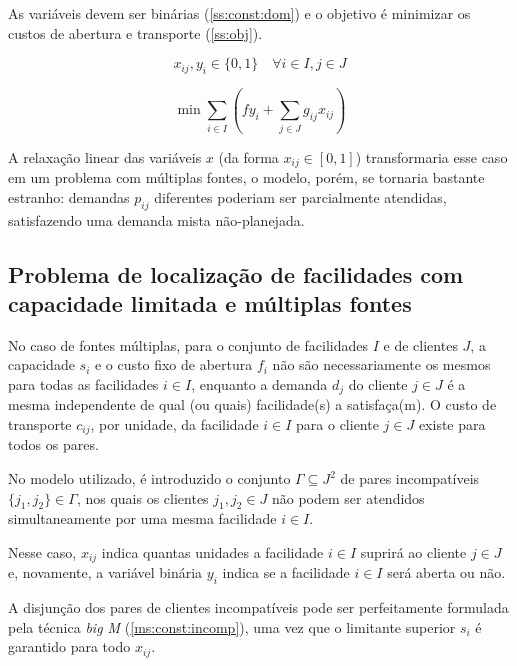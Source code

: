 \documentclass[]{article}
\begin{document}
	As variáveis devem ser binárias (\ref{ss:const:dom}) 
	e o objetivo é minimizar os custos de abertura e transporte (\ref{ss:obj}).
	
	\begin{equation}
		\label{ss:const:dom}		
		x_{ij}, y_i \in \{0, 1\}
		\quad
		\forall i \in I, j \in J
	\end{equation}	
	
	\begin{equation}
		\label{ss:obj}		
		\min \sum_{i \in I} 
		(
			f y_i + \sum_{j \in J} g_{ij} x_{ij}
		)
	\end{equation}

	A relaxação linear das variáveis $x$ (da forma $x_{ij} \in [0,1]$) transformaria esse caso em um problema com múltiplas fontes, 
	o modelo, porém, se tornaria bastante estranho:  
	demandas $p_{ij}$ diferentes poderiam ser parcialmente atendidas, satisfazendo uma demanda mista não-planejada.
	
	\subsection{Problema de localização de facilidades com capacidade limitada e múltiplas fontes}
	
	No caso de fontes múltiplas, para o conjunto de facilidades $I$ e de clientes $J$, 
	a capacidade $s_i$ e o custo fixo de abertura $f_i$ não são necessariamente os mesmos para todas as facilidades $i \in I$, 
	enquanto a demanda $d_j$ do cliente $j \in J$ é a mesma
	independente de qual (ou quais) facilidade(s) a satisfaça(m). 
	O custo de transporte $c_{ij}$, por unidade, da facilidade $i \in I$ para o cliente $j \in J$ existe para todos os pares.
	
	No modelo utilizado, é introduzido o conjunto $\Gamma \subseteq J^2$ de pares incompatíveis $\{ j_1, j_2 \} \in \Gamma$, 
	nos quais os clientes $j_1, j_2 \in J$ não podem ser atendidos simultaneamente por uma mesma facilidade $i \in I$.
	
	Nesse caso, $x_{ij}$ indica quantas unidades a facilidade $i \in I$ suprirá ao cliente $j \in J$ 
	e, novamente, a variável binária $y_i$ indica se a facilidade $i \in I$ será aberta ou não.
	
	A disjunção dos pares de clientes incompatíveis pode ser perfeitamente formulada pela técnica \textit{big M} (\ref{ms:const:incomp}), 
	uma vez que o limitante superior $s_i$ é garantido para todo $x_{ij}$.
	
\end{document}
